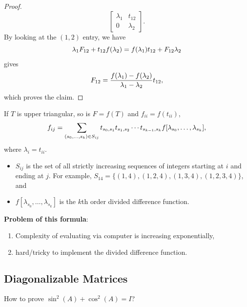 \documentclass{article}
\begin{document}
\begin{example}
\begin{proof}
\begin{equation}
            \begin{bmatrix} \lambda_1 & t_{12} \\ 0 & \lambda_2 \end{bmatrix}.
        \end{equation}
        By looking at the $(1,2)$ entry, we have 
        \begin{equation}\notag
            \lambda_1 F_{12}+ t_{12} f(\lambda_2) = f(\lambda_1)t_{12} + F_{12}\lambda_2
        \end{equation}
        gives 
        \begin{equation}\notag
            F_{12} = \frac{f(\lambda_1) - f(\lambda_2)}{\lambda_1 - \lambda_2} t_{12},
        \end{equation}
        which proves the claim.
    \end{proof}
\end{example}

\begin{theorem}
     If $T$ is upper
    triangular, so is $F = f(T)$ and $f_{ii} = f(t_{ii})$, 
    \begin{equation}\notag
        f_{ij} = \sum_{(s_0,\dots,s_k) \in S_{ij}} t_{s_0,s_1}t_{s_1,s_2}\cdots t_{s_{k-1},s_k} f[\lambda_{s_0}, \dots, \lambda_{s_k}],
    \end{equation}
    where $\lambda_i = t_{ii}$.
    \begin{itemize}
        \item $S_{ij}$ is the set of all strictly increasing sequences
        of integers starting at $i$ and ending at $j$. For example,
        $S_{14} = \{(1,4),(1,2,4),(1,3,4),(1,2,3,4)\}$, and 
        \item $f[\lambda_{s_0}, \dots, \lambda_{s_k}]$ is the $k$th
        order divided difference function.
    \end{itemize}
\end{theorem}

\textbf{Problem of this formula}:
\begin{enumerate}
    \item Complexity of evaluating via computer is increasing
    exponentially,
    \item hard/tricky to implement the divided difference function.
\end{enumerate}

\subsection{Diagonalizable Matrices}
How to prove $\sin^2(A) + \cos^2(A) = I$?
\end{document}
